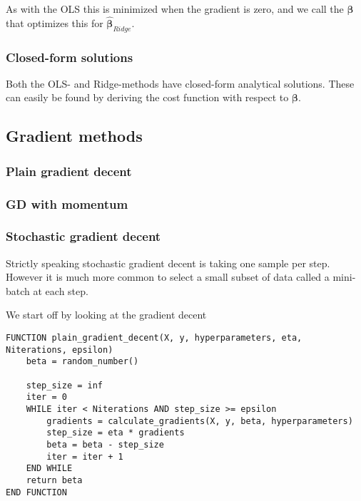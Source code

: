 As with the OLS this is minimized when the gradient is zero, and we call the $\boldsymbol\beta$ that optimizes this for $\hat{\boldsymbol\beta}_{Ridge}$. 

\subsubsection{Closed-form solutions}
Both the OLS- and Ridge-methods have closed-form analytical solutions. These can easily be found by deriving the cost function with respect to $\boldsymbol{\beta}$. 
\subsection{Gradient methods}
\subsubsection{Plain gradient decent}

\subsubsection{GD with momentum}

\subsubsection{Stochastic gradient decent}
Strictly speaking stochastic gradient decent is taking one sample per step. 
However it is much more common to select a small subset of data called a mini-batch at each step.






We start off by looking at the gradient decent

\begin{lstlisting}
FUNCTION plain_gradient_decent(X, y, hyperparameters, eta, Niterations, epsilon)
	beta = random_number()

	step_size = inf
	iter = 0
	WHILE iter < Niterations AND step_size >= epsilon
		gradients = calculate_gradients(X, y, beta, hyperparameters)
		step_size = eta * gradients
		beta = beta - step_size
		iter = iter + 1
	END WHILE
	return beta
END FUNCTION
\end{lstlisting}





